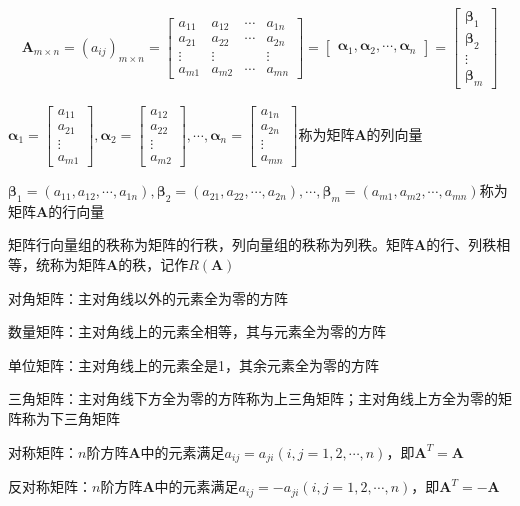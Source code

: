 \documentclass[12pt]{book}
\begin{document}
\begin{gather*}
    \mathbf{A}_{m\times n} = (a_{ij})_{m\times n} = 
    \begin{bmatrix}
        a_{11} & a_{12} & \cdots & a_{1n} \\
        a_{21} & a_{22} & \cdots & a_{2n} \\
        \vdots & \vdots &        & \vdots \\
        a_{m1} & a_{m2} & \cdots & a_{mn} 
    \end{bmatrix}
    = \begin{bmatrix}
        \bm{\alpha}_1 , \bm{\alpha}_2 , \cdots , \bm{\alpha}_n  
    \end{bmatrix}
    = \begin{bmatrix}
        \bm{\beta}_1 \\\bm{\beta}_2 \\ \vdots \\\bm{\beta}_m
    \end{bmatrix}
\end{gather*}
\par  $\bm{\alpha}_1 = \begin{bmatrix}
        a_{11}\\a_{21}\\\vdots\\a_{m1}
    \end{bmatrix},
    \bm{\alpha}_2 = \begin{bmatrix}
        a_{12}\\a_{22}\\\vdots\\a_{m2}
    \end{bmatrix},\cdots,
    \bm{\alpha}_n = \begin{bmatrix}
        a_{1n}\\a_{2n}\\\vdots\\a_{mn}
    \end{bmatrix}$称为矩阵$\bm{A}$的列向量
\par $ \bm{\beta}_1=(a_{11},a_{12},\cdots,a_{1n}), \bm{\beta}_2= (a_{21},a_{22},\cdots,a_{2n}),\cdots,\bm{\beta}_m=(a_{m1},a_{m2},\cdots,a_{mn}) $称为矩阵$\bm{A}$的行向量
\par 矩阵行向量组的秩称为矩阵的行秩，列向量组的秩称为列秩。矩阵$\bm{A}$的行、列秩相等，统称为矩阵$\bm{A}$的秩，记作$R(\bm{A})$
\par 对角矩阵：主对角线以外的元素全为零的方阵
\par 数量矩阵：主对角线上的元素全相等，其与元素全为零的方阵
\par 单位矩阵：主对角线上的元素全是1，其余元素全为零的方阵
\par 三角矩阵：主对角线下方全为零的方阵称为上三角矩阵；主对角线上方全为零的矩阵称为下三角矩阵
\par 对称矩阵：$n$阶方阵$\bm{A}$中的元素满足$a_{ij}=a_{ji} (i,j=1,2,\cdots,n)$，即$\bm{A}^T=\bm{A}$
\par 反对称矩阵：$n$阶方阵$\bm{A}$中的元素满足$a_{ij}=-a_{ji} (i,j=1,2,\cdots,n)$，即$\bm{A}^T=-\bm{A}$
\end{document}

